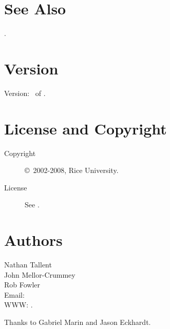 \documentclass[english]{article}
\begin{document}
\section{See Also}

.

\section{Version}

Version: \Version\ of \Date.

\section{License and Copyright}

\begin{description}
\item[Copyright] \copyright\ 2002-2008, Rice University.
\item[License] See .
\end{description}

\section{Authors}

\noindent
Nathan Tallent \\
John Mellor-Crummey \\
Rob Fowler \\
Email:  \\
WWW: .

Thanks to Gabriel Marin and Jason Eckhardt.

\LatexManEnd
\end{document}
